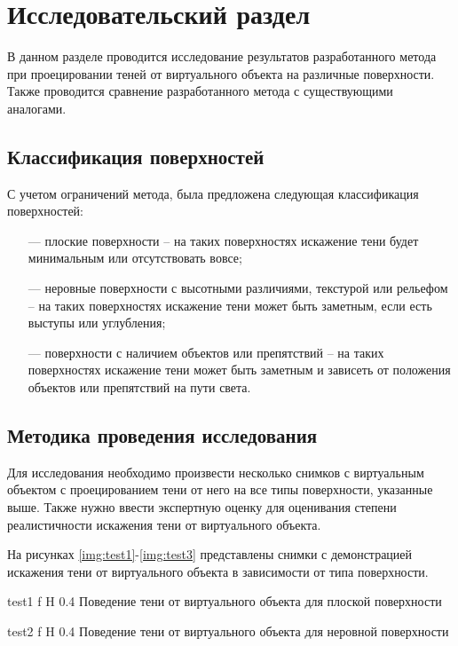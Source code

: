 \chapter{Исследовательский раздел}

В данном разделе проводится исследование результатов разработанного метода при проецировании теней от виртуального объекта на различные поверхности. Также проводится сравнение разработанного метода с существующими аналогами.

\section{Классификация поверхностей}

С учетом ограничений метода, была предложена следующая классификация поверхностей:

\begin{itemize}
	\item[---] плоские поверхности -- на таких поверхностях искажение тени будет минимальным или отсутствовать вовсе;
	\item[---] неровные поверхности с высотными различиями, текстурой или рельефом -- на таких поверхностях искажение тени может быть заметным, если есть выступы или углубления;
	\item[---] поверхности с наличием объектов или препятствий -- на таких поверхностях искажение тени может быть заметным и зависеть от положения объектов или препятствий на пути света.
\end{itemize}

\section{Методика проведения исследования}

Для исследования необходимо произвести несколько снимков с виртуальным объектом с проецированием тени от него на все типы поверхности, указанные выше. Также нужно ввести экспертную оценку для оценивания степени реалистичности искажения тени от виртуального объекта.

На рисунках \ref{img:test1}-\ref{img:test3} представлены снимки с демонстрацией искажения тени от виртуального объекта в зависимости от типа поверхности.

{test1}
{f}
{H}
{0.4\textwidth}
{Поведение тени от виртуального объекта для плоской поверхности}

{test2}
{f}
{H}
{0.4\textwidth}
{Поведение тени от виртуального объекта для неровной поверхности}

